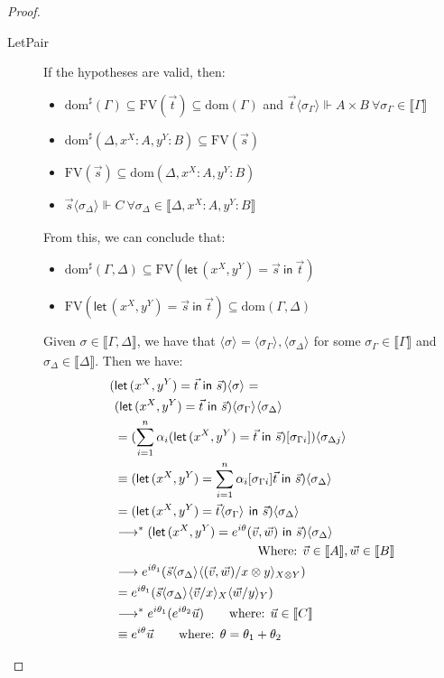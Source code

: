 \documentclass[a4paper,UKenglish,numberwithinsect,pdfa,anonymous]{lipics-v2021}
\theoremstyle{restatestyle}
\newcommand\lra{\longrightarrow}
\newcommand\ansubst[2]{\ensuremath{\langle #1 \rangle_{#2}}}
\newcommand\dom[1]{\mathrm{dom}(#1)}
\newcommand\sdom[1]{\mathrm{dom}^{\sharp}(#1)}
\newcommand\FV[1]{\mathrm{FV}(#1)}
\def\Pair#1#2{(#1,#2)} %
\def\letkeyword{\mathsf{let}}
\def\inkeyword{\mathsf{in}}
\def\LetP#1#2#3#4#5#6{\letkeyword\,\Pair{#1^{#2}}{#3^{#4}}=#5~\inkeyword~#6}
\def\eval{\lra^*}
\def\sem#1{\llbracket#1\rrbracket}
\begin{document}
\begin{proof}
\begin{description}
    \item[LetPair] If the hypotheses are valid, then:
    \begin{itemize}
        \item $\sdom{\Gamma}\subseteq \FV{\vec t} \subseteq \dom{\Gamma}$ and $\vec t \ansubst{\sigma_\Gamma}{}\Vdash A\times B\ \forall \sigma_\Gamma\in\sem\Gamma$
        \item $\sdom{\Delta, {x}^{X}:A, {y}^{Y}:B}\subseteq\FV{\vec s}$
        \item $\FV{\vec{s}}\subseteq \dom{\Delta, {x}^{X}:A, {y}^{Y}:B}$
        \item $\vec s \ansubst{\sigma_\Delta}{}\Vdash C\ \forall \sigma_\Delta\in\sem{\Delta, {x}^{X}:A, {y}^{Y}:B}$
    \end{itemize}
    From this, we can conclude that:
    \begin{itemize}
        \item $\sdom{\Gamma,\Delta}\subseteq\FV{\LetP{x}{X}{y}{Y}{\vec{s}}{\vec{t}}}$
        \item $\FV{\LetP{x}{X}{y}{Y}{\vec{s}}{\vec{t}}}\subseteq\dom{\Gamma,\Delta}$
    \end{itemize}
    
    Given $\sigma\in\sem{\Gamma,\Delta}$, we have that $\ansubst{\sigma}{}=\ansubst{\sigma_\Gamma}{},\ansubst{\sigma_\Delta}{}$ for some $\sigma_\Gamma\in\sem\Gamma$ and $\sigma_\Delta\in\sem\Delta$. Then we have:
    \begin{align*}
        (&\LetP{x}{X}{y}{Y}{\vec{t}}{\vec{s}})\ansubst{\sigma}{} = \\
        &(\LetP{x}{X}{y}{Y}{\vec{t}}{\vec{s}})\ansubst{\sigma_\Gamma}{}\ansubst{\sigma_\Delta}{}\\
        &= (\sum_{i=1}^{n}\alpha_i(\LetP{x}{X}{y}{Y}{\vec{t}}{\vec{s}})[\sigma_{\Gamma i}])\ansubst{\sigma_{\Delta j}}{}\\
        &\equiv (\LetP{x}{X}{y}{Y}{\sum_{i=1}^{n}\alpha_i[\sigma_{\Gamma i}]\vec{t}}{\vec{s}})\ansubst{\sigma_\Delta}{}\\
        &= (\LetP{x}{X}{y}{Y}{\vec{t}\ansubst{\sigma_\Gamma}{}}{\vec{s}})\ansubst{\sigma_\Delta}{}\\
        &\eval (\LetP{x}{X}{y}{Y}{e^{i\theta} \Pair{\vec{v}}{\vec{w}}}{\vec{s}})\ansubst{\sigma_\Delta}{}\\
        &\hspace*{4cm}{\text{Where: }}\vec{v}\in\sem{A},\vec{w}\in\sem{B}\\
        &\lra e^{i\theta_1} (\vec{s}\ansubst{\sigma_\Delta}{}\ansubst{\Pair{\vec{v}}{\vec{w}}/x\otimes y}{X\otimes Y})\\
        &= e^{i\theta_1} (\vec{s}\ansubst{\sigma_\Delta}{}\ansubst{\vec{v}/x}{X}\ansubst{\vec{w}/y}{Y})\\
        &\eval e^{i\theta_1}  (e^{i\theta_2}  \vec{u})\qquad\text{where: }\vec{u}\in\sem{C}\\
        &\equiv e^{i\theta}  \vec{u}\qquad\text{where: }\theta=\theta_1 + \theta_2
    \end{align*}
    

\end{description}
\end{proof}
\end{document}
